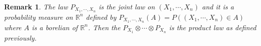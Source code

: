 \documentclass[10pt,a4paper]{book}
\newtheorem*{remark}{Remark}
\theoremstyle{definition}
\begin{document}
\begin{remark}
The law $P_{X_1, \cdots, X_n}$ is the joint law on $(X_1, \cdots, X_n)$ and it is a probability measure on $\mathbb{R}^n$ defined by $P_{X_1, \cdots, X_n}(A) = P((X_1, \cdots, X_n) \in A)$ where $A$ is a borelian of $\mathbb{R}^n$. Then the $P_{X_1} \otimes \cdots \otimes P_{X_n}$ is the product law as defined previously.  
\end{remark}
\end{document}
